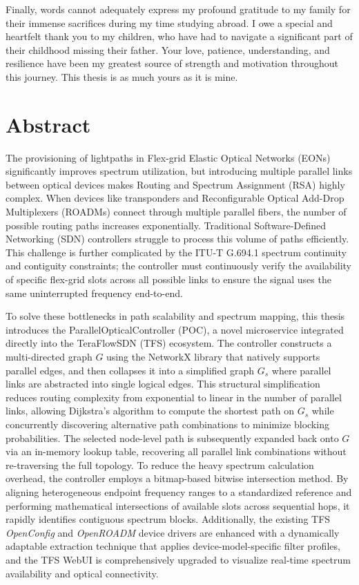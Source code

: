 \documentclass[12pt, a4paper, twoside, openright]{report}
\begin{document}
Finally, words cannot adequately express my profound gratitude to my family for their immense sacrifices during my time studying abroad. I owe a special and heartfelt thank you to my children, who have had to navigate a significant part of their childhood missing their father. Your love, patience, understanding, and resilience have been my greatest source of strength and motivation throughout this journey. This thesis is as much yours as it is mine.

\chapter*{Abstract}  The provisioning of lightpaths in Flex-grid Elastic Optical Networks (EONs) significantly improves spectrum utilization, but introducing multiple parallel links between optical devices makes Routing and Spectrum Assignment (RSA) highly complex. When devices like transponders and Reconfigurable Optical Add-Drop Multiplexers (ROADMs) connect through multiple parallel fibers, the number of possible routing paths increases exponentially. Traditional Software-Defined Networking (SDN) controllers struggle to process this volume of paths efficiently. This challenge is further complicated by the ITU-T G.694.1 spectrum continuity and contiguity constraints; the controller must continuously verify the availability of specific flex-grid slots across all possible links to ensure the signal uses the same uninterrupted frequency end-to-end.

To solve these bottlenecks in path scalability and spectrum mapping, this thesis introduces the ParallelOpticalController (POC), a novel microservice integrated directly into the TeraFlowSDN (TFS) ecosystem. The controller constructs a multi-directed graph $G$ using the NetworkX library that natively supports parallel edges, and then collapses it into a simplified graph $G_s$ where parallel links are abstracted into single logical edges. This structural simplification reduces routing complexity from exponential to linear in the number of parallel links, allowing Dijkstra's algorithm to compute the shortest path on $G_s$ while concurrently discovering alternative path combinations to minimize blocking probabilities. The selected node-level path is subsequently expanded back onto $G$ via an in-memory lookup table, recovering all parallel link combinations without re-traversing the full topology. To reduce the heavy spectrum calculation overhead, the controller employs a bitmap-based bitwise intersection method. By aligning heterogeneous endpoint frequency ranges to a standardized reference and performing mathematical intersections of available slots across sequential hops, it rapidly identifies contiguous spectrum blocks. Additionally, the existing TFS \emph{OpenConfig} and \emph{OpenROADM} device drivers are enhanced with a dynamically adaptable extraction technique that applies device-model-specific filter profiles, and the TFS WebUI is comprehensively upgraded to visualize real-time spectrum availability and optical connectivity.
\end{document}
